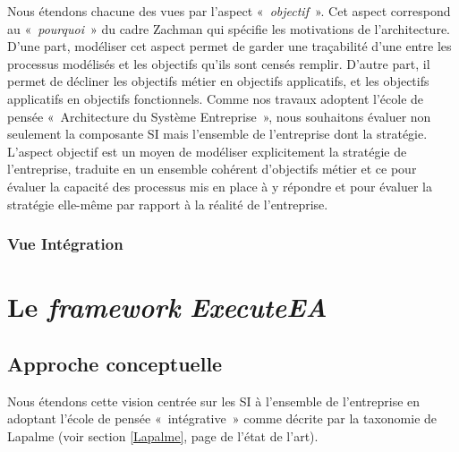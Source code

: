 Nous étendons chacune des vues par l'aspect «~\textit{objectif}~». Cet aspect
correspond au «~\textit{pourquoi}~» du cadre Zachman qui spécifie les
motivations de l'architecture. D'une part, modéliser cet aspect permet de garder
une traçabilité d'une entre les processus modélisés et les objectifs qu'ils sont
censés remplir. D'autre part, il permet de décliner les objectifs métier en
objectifs applicatifs, et les objectifs applicatifs en objectifs fonctionnels.
Comme nos travaux adoptent l'école de pensée «~Architecture du Système
Entreprise~», nous souhaitons évaluer non seulement la composante SI mais
l'ensemble de l'entreprise dont la stratégie. L'aspect objectif est un moyen de
modéliser explicitement la stratégie de l'entreprise, traduite en un ensemble
cohérent d'objectifs métier et ce pour évaluer la capacité des processus mis en
place à y répondre et pour évaluer la stratégie elle-même par rapport à la
réalité de l'entreprise.




    \subsubsection{Vue Intégration}















\section[Le framework ExecuteEA]{Le \emph{framework} \emph{ExecuteEA}}

    \subsection{Approche conceptuelle}
    Nous étendons
cette vision centrée sur les SI à l'ensemble de l'entreprise en adoptant l'école
de pensée «~intégrative~» comme décrite par la taxonomie de Lapalme (voir
section \ref{Lapalme}, page \pageref{Lapalme} de l'état de l'art).

